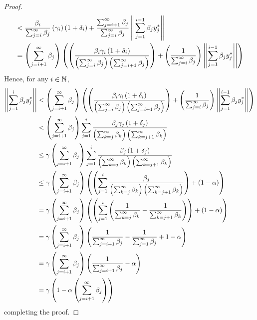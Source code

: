 \begin{lem}
\begin{proof}
\begin{equation}
\begin{split}
                & < \frac{\beta_i}{\sum_{j=i}^{\infty} \beta_j} \left( \gamma_i\right)\left( 1+\delta_i\right)+\frac{\sum_{j=i+1}^{\infty} \beta_j}{\sum_{j=i}^{\infty} \beta_j} \left|\left| \sum_{j=1}^{i-1} \beta_j y_j^* \right|\right|\\
                & = \left(  \sum_{j=i+1}^{\infty} \beta_j\right) \left(  \left(  \frac{\beta_i \gamma_i \left( 1+\delta_i\right)}{\left( \sum_{j=i}^\infty \beta_j\right)\left( \sum_{j=i+1}^\infty \beta_j\right)}\right)+ \left( \frac{1}{\sum_{j=i}^\infty \beta_j}\right) \left|\left| \sum_{j=1}^{i-1} \beta_j y_j^* \right|\right|\right)
            \end{split}
        \end{equation}
        Hence, for any $i \in \mathbb{N}$, 
        \begin{equation}
            \begin{split}
                \left|\left| \sum_{j=1}^i \beta_j y_j^* \right|\right| & < \left( \sum_{j=i+1}^\infty \beta_j\right) \left(  \left(  \frac{\beta_i\gamma_i\left( 1+\delta_i\right)}{\left( \sum_{j=i}^\infty \beta_j\right)\left(  \sum_{j=i+1}^\infty \beta_j\right)}\right) + \left( \frac{1}{\sum_{j=i}^\infty \beta_j}\right) \left|\left| \sum_{j=1}^{i-1} \beta_j y_j^* \right|\right|\right)\\
                & < \left( \sum_{j=i+1}^{\infty} \beta_j\right) \sum_{j=1}^i \frac{\beta_j \gamma_j\left( 1+\delta_j\right)}{\left( \sum_{k=j}^\infty \beta_k\right)\left(  \sum_{k=j+1}^\infty \beta_k\right)}\\
                & \leq \gamma \left( \sum_{j=i+1}^{\infty} \beta_j\right) \sum_{j=1}^i \frac{\beta_j \left( 1+\delta_j\right)}{\left( \sum_{k=j}^\infty \beta_k\right)\left(  \sum_{k=j+1}^\infty \beta_k\right)}\\
                &\leq \gamma \left(  \sum_{j=i+1}^\infty \beta_j\right)\left(  \left(  \sum_{j=1}^i \frac{\beta_j}{\left( \sum_{k=j}^\infty \beta_k\right)\left(  \sum_{k=j+1}^\infty \beta_k\right)}\right)+ \left( 1-\alpha\right)\right)\\
                & = \gamma \left(  \sum_{j=i+1}^\infty \beta_j\right)\left(  \left(  \sum_{j=1}^i\left( \frac{1}{\sum_{k=j}^\infty \beta_k}-\frac{1}{\sum_{k=j+1}^\infty \beta_k}\right)\right)+ \left( 1-\alpha\right)\right)\\
                & = \gamma\left( \sum_{j=i+1}^\infty \beta_j\right) \left(  \frac{1}{\sum_{j=i+1}^\infty \beta_j} - \frac{1}{\sum_{j=1}^{\infty} \beta_j}+1-\alpha\right)\\
                &=\gamma \left(  \sum_{j=i+1}^\infty \beta_j\right) \left(  \frac{1}{\sum_{j=i+1}^\infty \beta_j}- \alpha\right)\\
                & = \gamma \left(  1- \alpha \left( \sum_{j=i+1}^\infty \beta_j\right)\right)
            \end{split} 
        \end{equation}
        completing the proof.
    \end{proof}

\end{lem}
